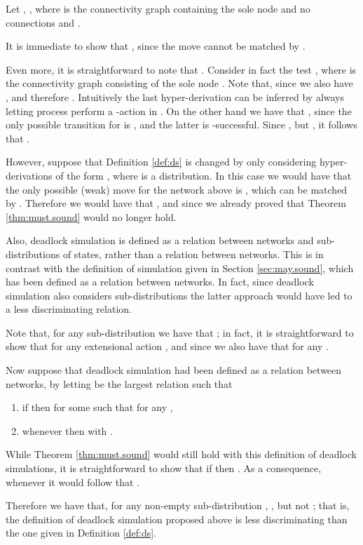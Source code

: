 \documentclass{LMCS}
\begin{document}
\begin{exa}[Divergence]
\label{ex:divergence}
Let , 
, 
where  is the connectivity graph containing 
the sole node  and no connections and 
. 

It is immediate to show that , 
since the move  cannot 
be matched by . 

Even more, it is straightforward to 
note that . Consider in fact the test 
,  
where  is the connectivity graph consisting of the 
sole node . Note that, since  
we also have , 
and therefore . Intuitively 
the last hyper-derivation can be inferred by always letting 
process  perform a -action in 
. On the other hand we have 
that , since the only possible 
transition for   is 
, 
and the latter is -successful.  
Since , but , 
it follows that .

However, suppose that Definition \ref{def:ds} is changed 
by only considering hyper-derivations of the form 
, where  is 
a distribution. 
In this case we would have that the only possible (weak) move 
for the network  above is , 
which can be matched by . 
Therefore we would have that , and 
since we already proved that  Theorem 
\ref{thm:must.sound} would no longer hold.
\end{exa}

Also, deadlock simulation is defined as a 
relation between networks and sub-distributions of 
states, rather than a relation between networks. 
This is in contrast with the definition of simulation 
given in Section \ref{sec:may.sound}, which 
has been defined as a relation between 
networks.
In fact, since deadlock simulation also considers 
sub-distributions the latter approach would have led to 
a less discriminating relation.

\begin{remark}
Note that, for any sub-distribution  
we have that ; 
in fact, it is straightforward to show that 
 for 
any extensional action , and 
since  we 
also have that  
for any .

Now suppose that deadlock simulation had 
been defined as a relation between networks, 
by letting  be the largest 
relation such that 
\begin{enumerate}[label=(\roman*)] 
\item if  then  
for some  such that  for any 
, 
\item whenever  then 
 with . 
\end{enumerate}\medskip

\noindent While Theorem \ref{thm:must.sound} would still 
hold with this definition of deadlock simulations, 
it is straightforward to show that if 
 then . As a consequence, whenever 
 it would 
follow that . 

Therefore we have that, for any non-empty sub-distribution 
, , but not
;
that is, the definition of deadlock simulation proposed 
above is less discriminating than the one given in 
Definition \ref{def:ds}.
\end{remark} 
\end{document}
